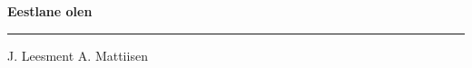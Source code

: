 \documentclass[10pt]{book}
\begin{document}
{
  \samepage
  \raggedbottom
  \raggedright
  \sloppy


  \vspace{0.2in}

  \noindent\begin{minipage}{.1\textwidth}
    \hfill\vspace{0.1in}
  \end{minipage}%
  \noindent\begin{minipage}{.8\textwidth}
    \centering
    \bfseries
    \large Eestlane olen
  \end{minipage}%
  \noindent\begin{minipage}{.1\textwidth}
      \hfill\vspace{0.1in}
  \end{minipage}

  \nopagebreak[4]
  \vspace{0.1in}
  \nopagebreak[4]
  \hrule height 0.05ex
  \nopagebreak[4]
  \vspace{-0.05in}

  {\footnotesize J. Leesment \hfill A. Mattiisen }\\
  \vspace{0.01in}



}
\end{document}
